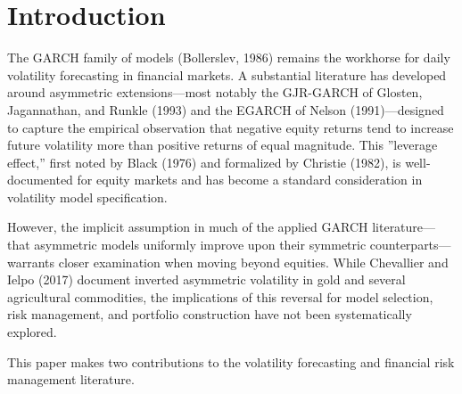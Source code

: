 

\section{Introduction}

The GARCH family of models (Bollerslev, 1986) remains the workhorse for daily volatility forecasting in financial markets. A substantial literature has developed around asymmetric extensions---most notably the GJR-GARCH of Glosten, Jagannathan, and Runkle (1993) and the EGARCH of Nelson (1991)---designed to capture the empirical observation that negative equity returns tend to increase future volatility more than positive returns of equal magnitude. This ''leverage effect,'' first noted by Black (1976) and formalized by Christie (1982), is well-documented for equity markets and has become a standard consideration in volatility model specification.

However, the implicit assumption in much of the applied GARCH literature---that asymmetric models uniformly improve upon their symmetric counterparts---warrants closer examination when moving beyond equities. While Chevallier and Ielpo (2017) document inverted asymmetric volatility in gold and several agricultural commodities, the implications of this reversal for model selection, risk management, and portfolio construction have not been systematically explored.

This paper makes two contributions to the volatility forecasting and financial risk management literature.

